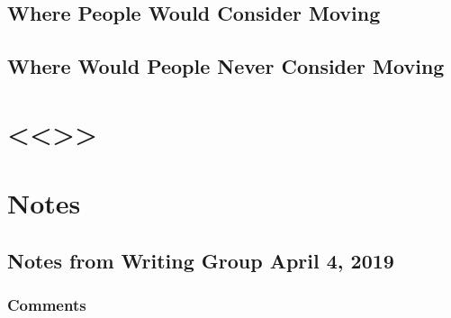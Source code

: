 \documentclass{baderart}
\begin{document}
\subsection{Where People Would Consider
Moving}\label{where-people-would-consider-moving}

\subsection{Where Would People Never Consider
Moving}\label{where-would-people-never-consider-moving}

\section{\textless{}\textless{}\textgreater{}\textgreater{}}\label{section-4}

\section{Notes}\label{notes}

\subsection{Notes from Writing Group April 4,
2019}\label{notes-from-writing-group-april-4-2019}

\subsubsection{Comments}\label{comments}
\end{document}
